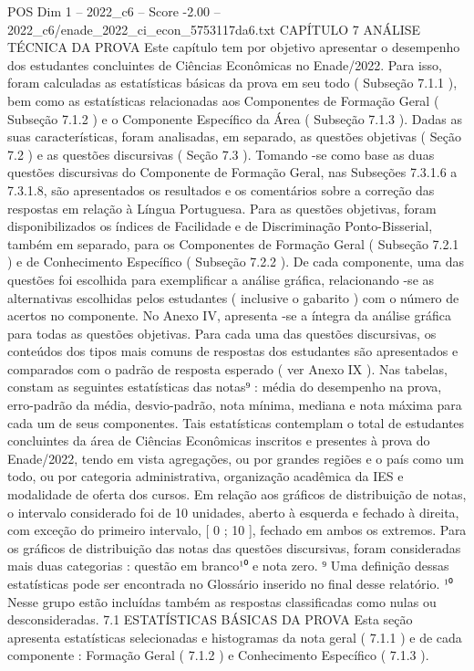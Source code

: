 \begin{textsample}{POS Dim 1 – 2022\_c6 – Score -2.00 – 2022\_c6/enade\_2022\_ci\_econ\_5753117da6.txt}  \label{ex:f1_pos_263}
CAPÍTULO 7 ANÁLISE TÉCNICA DA PROVA Este capítulo tem por objetivo apresentar o desempenho dos estudantes concluintes de Ciências Econômicas no Enade/2022.
Para isso, foram calculadas as estatísticas básicas da prova em seu todo ( Subseção 7.1.1 ), bem como as estatísticas relacionadas aos Componentes de Formação Geral ( Subseção 7.1.2 ) e o Componente Específico da Área ( Subseção 7.1.3 ).
Dadas as suas características, foram analisadas, em separado, as questões objetivas ( Seção 7.2 ) e as questões discursivas ( Seção 7.3 ).
Tomando -se como base as duas questões discursivas do Componente de Formação Geral, nas Subseções 7.3.1.6 a 7.3.1.8, são apresentados os resultados e os comentários sobre a correção das respostas em relação à Língua Portuguesa.
Para as questões objetivas, foram disponibilizados os índices de Facilidade e de Discriminação Ponto-Bisserial, também em separado, para os Componentes de Formação Geral ( Subseção 7.2.1 ) e de Conhecimento Específico ( Subseção 7.2.2 ).
De cada componente, uma das questões foi escolhida para exemplificar a análise gráfica, relacionando -se as alternativas escolhidas pelos estudantes ( inclusive o gabarito ) com o número de acertos no componente.
No Anexo IV, apresenta -se a íntegra da análise gráfica para todas as questões objetivas.
Para cada uma das questões discursivas, os conteúdos dos tipos mais comuns de respostas dos estudantes são apresentados e comparados com o padrão de resposta esperado ( ver Anexo IX ).
Nas tabelas, constam as seguintes estatísticas das notas⁹ : média do desempenho na prova, erro-padrão da média, desvio-padrão, nota mínima, mediana e nota máxima para cada um de seus componentes.
Tais estatísticas contemplam o total de estudantes concluintes da área de Ciências Econômicas inscritos e presentes à prova do Enade/2022, tendo em vista agregações, ou por grandes regiões e o país como um todo, ou por categoria administrativa, organização acadêmica da IES e modalidade de oferta dos cursos.
Em relação aos gráficos de distribuição de notas, o intervalo considerado foi de 10 unidades, aberto à esquerda e fechado à direita, com exceção do primeiro intervalo, [ 0 ; 10 ], fechado em ambos os extremos.
Para os gráficos de distribuição das notas das questões discursivas, foram consideradas mais duas categorias : questão em branco¹⁰ e nota zero. ⁹ Uma definição dessas estatísticas pode ser encontrada no Glossário inserido no final desse relatório. ¹⁰ Nesse grupo estão incluídas também as respostas classificadas como nulas ou desconsideradas. 7.1 ESTATÍSTICAS BÁSICAS DA PROVA Esta seção apresenta estatísticas selecionadas e histogramas da nota geral ( 7.1.1 ) e de cada componente : Formação Geral ( 7.1.2 ) e Conhecimento Específico ( 7.1.3 ).

\end{textsample}
